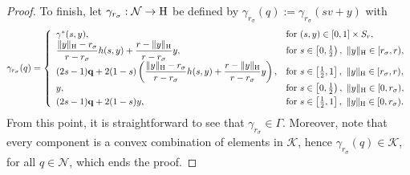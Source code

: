 \documentclass{article}
\newcommand{\boK}{\mathcal{K}}
\newcommand{\boN}{\mathcal{N}}
\newcommand{\Hilb}{{\textnormal H}}
\newcommand{\minq}{{\bf q}}
\theoremstyle{definition}
\begin{document}
\begin{proof}
To finish, let $\gamma_{r_\sigma}: \boN \to \Hilb$ be defined by $\gamma_{r_\sigma}(q) := \gamma_{r_\sigma}(sv + y)$ with
    \begin{equation}\label{def:gamma-example}
      \gamma_{r_\sigma}(q)=\left\{\begin{array}{ll}
            \gamma^*(s,y),&\hbox{for } (s,y)\in[0,1]\times S_r, \\
            \dfrac{\|y\|_\Hilb-r_\sigma}{r-r_\sigma}h(s,y)+\dfrac{r-\|y\|_\Hilb}{r-r_\sigma}y, &\hbox{for }s\in\left[0,\tfrac{1}{2}\right),\ \|y\|_\Hilb\in[r_\sigma,r),\\
            (2s-1)\minq+2(1-s)\left(\dfrac{\|y\|_\Hilb-r_\sigma}{r-r_\sigma}h(s,y)+\dfrac{r-\|y\|_\Hilb}{r-r_\sigma}y\right),&\hbox{for }s\in\left[\tfrac{1}{2},1\right],\ \|y\|_\Hilb\in[r_\sigma,r),\\
            y,&\hbox{for }s\in\left[0,\tfrac{1}{2}\right),\ \|y\|_\Hilb\in[0,r_\sigma),\vspace{1mm}\\
            (2s-1)\minq+2(1-s)y,&\hbox{for }s\in\left[\tfrac{1}{2},1\right],\ \|y\|_\Hilb\in[0,r_\sigma).
        \end{array}\right.
    \end{equation}
From this point, it is straightforward to see that $\gamma_{r_\sigma}\in\Gamma$. Moreover, note that every component is a convex combination of elements in $\boK$, hence $\gamma_{r_\sigma}(q)\in\boK$, for all $q\in\boN$, which ends the proof.
\end{proof}
\end{document}
